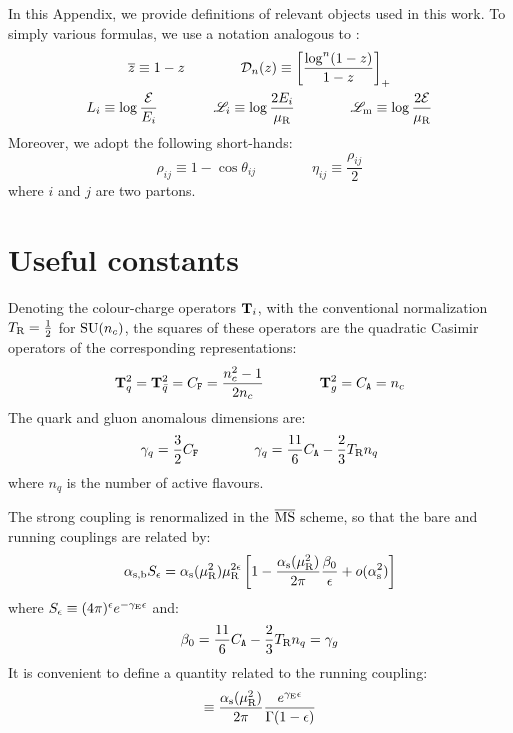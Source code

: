 
In this Appendix, we provide definitions of relevant objects used in this work. To simply various formulas, we use a notation analogous to \cite{rontsch-2503}:
\begin{equation}
  \begin{gathered}
    \overline{z} \equiv 1 - z
    \qquad \qquad
    \mathcal{D}_n(z) \equiv \left[ \frac{\log^n(1-z)}{1-z} \right]_+
    \\
    L_i \equiv \log \frac{\mathcal{E}}{E_i}
    \qquad \qquad
    \mathscr{L}_i \equiv \log \frac{2E_i}{\mu_\text{R}}
    \qquad \qquad
    \mathscr{L}_\text{m} \equiv \log \frac{2\mathcal{E}}{\mu_\text{R}}
  \end{gathered}
  \label{eq:log-short}
\end{equation}
Moreover, we adopt the following short-hands:
\begin{equation}
  \rho_{ij} \equiv 1 - \cos \theta_{ij}
  \qquad \qquad
  \eta_{ij} \equiv \frac{\rho_{ij}}{2}
  \label{eq:short-hand}
\end{equation}
where $ i $ and $ j $ are two partons.

\section{Useful constants}

Denoting the colour-charge operators $ \mathbf{T}_i $, with the conventional normalization $ T_\text{R} = \frac{1}{2} $ for $ \mathrm{SU}(n_c) $, the squares of these operators are the quadratic Casimir operators of the corresponding representations:
\begin{equation}
  \mathbf{T}_q^2 = \mathbf{T}_{\bar{q}}^2 = C_\mathtt{F} = \frac{n_c^2 - 1}{2n_c}
  \qquad \qquad
  \mathbf{T}_g^2 = C_\mathtt{A} = n_c
\end{equation}
The quark and gluon anomalous dimensions are:
\begin{equation}
  \gamma_q = \frac{3}{2} C_\mathtt{F}
  \qquad \qquad
  \gamma_q = \frac{11}{6} C_\mathtt{A} - \frac{2}{3} T_\text{R} n_q
\end{equation}
where $ n_q $ is the number of active flavours.

The strong coupling is renormalized in the $ \overline{\text{MS}} $ scheme, so that the bare and running couplings are related by:
\begin{equation}
  \alpha_\text{s,b} S_\epsilon = \alpha_\text{s}(\mu_\text{R}^2) \mu_\text{R}^{2\epsilon} \left[ 1 - \frac{\alpha_\text{s}(\mu_\text{R}^2)}{2\pi} \frac{\beta_0}{\epsilon} + o(\alpha_\text{s}^2) \right]
\end{equation}
where $ S_\epsilon \equiv (4\pi)^\epsilon e^{-\gamma_\text{E} \epsilon} $ and:
\begin{equation}
  \beta_0 = \frac{11}{6} C_\mathtt{A} - \frac{2}{3} T_\text{R} n_q = \gamma_g
\end{equation}
It is convenient to define a quantity related to the running coupling:
\begin{equation}
  [\rc] \equiv \frac{\rcr}{2\pi} \frac{e^{\eg \de}}{\Gamma(1-\de)}
\end{equation}

